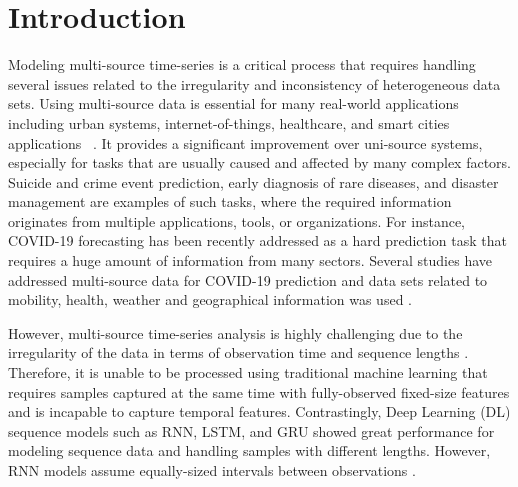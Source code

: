 \documentclass[conference]{IEEEtran}
\begin{document}
\section{Introduction}
Modeling multi-source time-series is a critical process that requires handling several issues related to the irregularity and inconsistency of heterogeneous data sets. Using multi-source data is essential for many real-world  applications including urban systems, internet-of-things, healthcare, and smart cities applications ~\cite{horn2020set,martinez2015survey,lim2020time}. It provides a significant improvement over uni-source systems, especially for tasks that are usually caused and affected by many complex factors. Suicide and crime event prediction,  early diagnosis of rare diseases, and disaster management are examples of such tasks, where the required information originates from multiple applications, tools, or organizations.  For instance, COVID-19 forecasting has been recently addressed as a hard prediction task that requires a huge amount of information from many sectors. Several studies have addressed multi-source data for COVID-19 prediction and data sets related to  mobility, health, weather and geographical information was used \cite{mahalle2020data, DBLP:journals/sncs/ShindeKMDCH20, DBLP:journals/jms/Santosh20}.


However, multi-source time-series analysis is highly challenging due to the irregularity of the data in terms of observation time and sequence lengths \cite{shukla2021multi}. Therefore, it is unable to be processed using traditional machine learning that requires samples captured at the same time with fully-observed fixed-size features and is incapable to capture temporal features. Contrastingly, Deep Learning (DL) sequence models such as RNN, LSTM, and GRU showed great performance for modeling sequence data and handling samples with different lengths. However, RNN models assume equally-sized intervals between observations \cite{sherstinsky2020fundamentals}.
\end{document}
